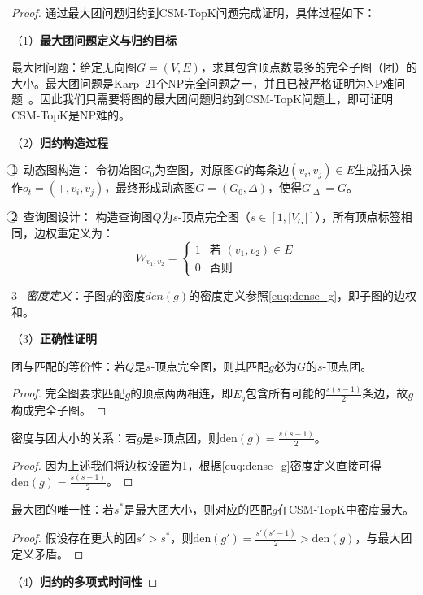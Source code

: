         \begin{proof}
        通过最大团问题归约到CSM-TopK问题完成证明，具体过程如下：

        （1）\textbf{最大团问题定义与归约目标}

        最大团问题：给定无向图$G=(V,E)$，求其包含顶点数最多的完全子图（团）的大小。最大团问题是Karp\ 21个NP完全问题之一，并且已被严格证明为NP难问题~\cite{clique-DBLP:journals/eor/WuH15}。因此我们只需要将图的最大团问题归约到CSM-TopK问题上，即可证明CSM-TopK是NP难的。
        
        （2）\textbf{归约构造过程}

        \textcircled{1}~动态图构造：
        令初始图$G_0$为空图，对原图$G$的每条边$(v_i,v_j)\in E$生成插入操作$o_t=(+,v_i,v_j)$，最终形成动态图$G=(G_0,\Delta)$，使得$G_{|\Delta|}=G$。
        
        \textcircled{2}~查询图设计：
        构造查询图$Q$为$s$-顶点完全图（$s\in[1,|V_G|]$），所有顶点标签相同，边权重定义为：
        \begin{equation}
        W_{v_1,v_2} = 
        \begin{cases} 
        1 & \text{若 }(v_1,v_2)\in E \\
        0 & \text{否则}
        \end{cases}
        \end{equation}
        
        
        \textcircled{3}~\textit{密度定义}：子图$g$的密度$den(g)$的密度定义参照\ref{euq:dense_g}，即子图的边权和。
        
        （3）\textbf{正确性证明}
        \begin{lemma}
            团与匹配的等价性：若$Q$是$s$-顶点完全图，则其匹配$g$必为$G$的$s$-顶点团。
        \end{lemma}
        \begin{proof}
            完全图要求匹配$g$的顶点两两相连，即$E_g$包含所有可能的$\frac{s(s-1)}{2}$条边，故$g$构成完全子图。
        \end{proof}
        \begin{lemma}
            密度与团大小的关系：若$g$是$s$-顶点团，则$\text{den}(g)=\frac{s(s-1)}{2}$。
        \end{lemma}
        \begin{proof}
            因为上述我们将边权设置为1，根据\ref{euq:dense_g}密度定义直接可得$\text{den}(g)=\frac{s(s-1)}{2}$。
        \end{proof}
        \begin{lemma}
            最大团的唯一性：若$s^*$是最大团大小，则对应的匹配$g$在CSM-TopK中密度最大。
        \end{lemma}
        \begin{proof}
            假设存在更大的团$s'>s^*$，则$\text{den}(g')=\frac{s'(s'-1)}{2}>\text{den}(g)$，与最大团定义矛盾。
        \end{proof}        
        （4）\textbf{归约的多项式时间性}


\end{proof}
